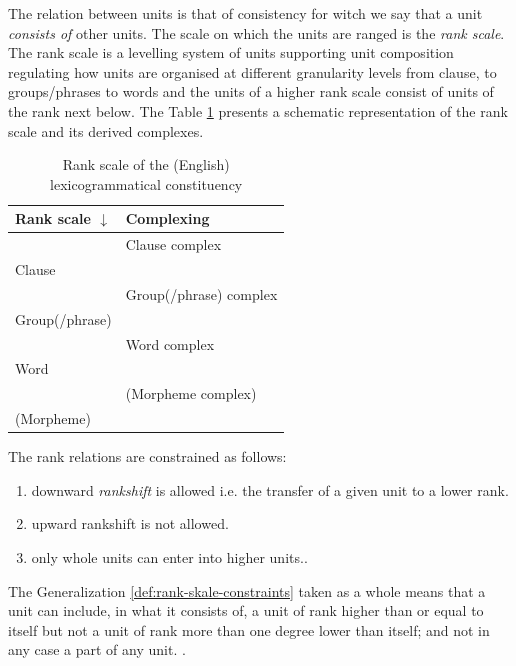 The relation between units is that of consistency for witch we say that a unit \textit{consists of} other units. The scale on which the units are ranged is the \textit{rank scale}. The rank scale is a levelling system of units supporting unit composition regulating how units are organised at different granularity levels from clause, to groups/phrases to words and the units of a higher rank scale consist of units of the rank next below. The Table \ref{tab:rank-scale} presents a schematic representation of the rank scale and its derived complexes.

\begin{table}[h]
	\centering
	\begin{tabular}{|l|l|}
		\hline
		{\bf Rank scale $\downarrow$} & {\bf Complexing} \\ \hline
		& Clause complex           \\ \hline
		Clause           &                          \\ \hline
		& Group(/phrase) complex   \\ \hline
		Group(/phrase)   &                          \\ \hline
		& Word complex             \\ \hline
		Word             &                          \\ \hline
		& (Morpheme complex)       \\ \hline
		(Morpheme)       &                          \\ \hline
	\end{tabular}
	\caption{Rank scale of the (English) lexicogrammatical constituency}
	\label{tab:rank-scale}
\end{table}

\begin{generalization}\label{def:rank-skale-constraints}
	The rank relations are constrained as follows:
	\begin{enumerate}
		\item downward \textit{rankshift} is allowed i.e. the transfer of a given unit to a lower rank.
		\item upward rankshift is not allowed.
		\item only whole units can enter into higher units.\citep[p.44]{Halliday2002}.
	\end{enumerate}
\end{generalization}

The Generalization \ref{def:rank-skale-constraints} taken as a whole means that a unit can include, in what it consists of, a unit of rank higher than or equal to itself but not a unit of rank more than one degree lower than itself; and not in any case a part of any unit. \citep[p.42]{Halliday2002}. 

